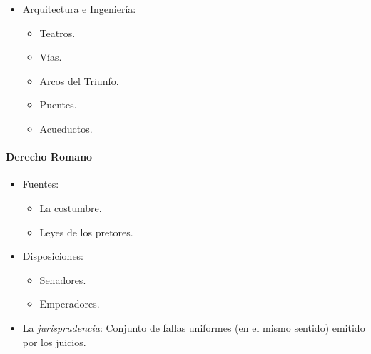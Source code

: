 \begin{itemize}
\item Arquitectura e Ingeniería:
\begin{itemize}
	\item Teatros.
	\item Vías.
	\item Arcos del Triunfo.
	\item Puentes.
	\item Acueductos.
\end{itemize}

\end{itemize}

\paragraph{Derecho Romano}

\begin{itemize}

\item Fuentes:
\begin{itemize}
	\item La costumbre.
	\item Leyes de los pretores.
\end{itemize}

\item Disposiciones:
\begin{itemize}
	\item Senadores.
	\item Emperadores.
\end{itemize}

\item La \emph{jurisprudencia}: Conjunto de fallas uniformes (en el mismo sentido) emitido por los juicios.

\end{itemize}
